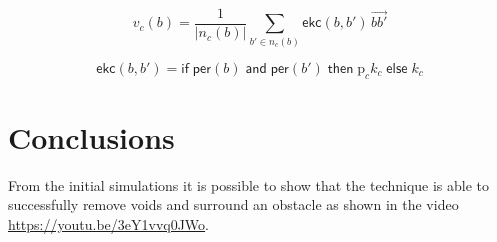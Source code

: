 \documentclass[12pt,a4paper]{IEEEtran}
\begin{document}
\begin{equation}\label{eq:cohesion3}
v_c(b) = \frac{1}{\lvert n_c(b)\rvert} \sum_{b' \in n_c(b)}\mathsf{ekc}(b, b')\, \vec{b b'}
\end{equation}

\small
\begin{equation}\label{eq:cohesion4}
\mathsf{ekc}(b, b') = \mathsf{if} \; \mathsf{per}(b) \; \mathsf{and} \; \mathsf{per}(b') \; \mathsf{then} \; \mathrm{p}_ck_c \; \mathsf{else} \; k_c
\end{equation}
\normalsize

\section{Conclusions}\label{conclusions}
From the initial simulations it is possible to show that the technique is able to successfully remove voids and surround an obstacle as shown in the video \href{https://youtu.be/3eY1vvq0JWo}{https://youtu.be/3eY1vvq0JWo}.



\end{document}
